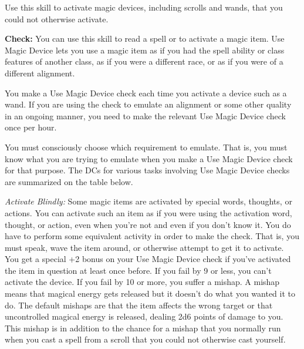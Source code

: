 Use this skill to activate magic devices, including scrolls and wands, that you could not otherwise activate.

\textbf{Check:} You can use this skill to read a spell or to activate a magic item. Use Magic Device lets you use a magic item as if you had the spell ability or class features of another class, as if you were a different race, or as if you were of a different alignment.

You make a Use Magic Device check each time you activate a device such as a wand. If you are using the check to emulate an alignment or some other quality in an ongoing manner, you need to make the relevant Use Magic Device check once per hour.

You must consciously choose which requirement to emulate. That is, you must know what you are trying to emulate when you make a Use Magic Device check for that purpose. The DCs for various tasks involving Use Magic Device checks are summarized on the table below.


\textit{Activate Blindly:} Some magic items are activated by special words, thoughts, or actions. You can activate such an item as if you were using the activation word, thought, or action, even when you're not and even if you don't know it. You do have to perform some equivalent activity in order to make the check. That is, you must speak, wave the item around, or otherwise attempt to get it to activate. You get a special +2 bonus on your Use Magic Device check if you've activated the item in question at least once before. If you fail by 9 or less, you can't activate the device. If you fail by 10 or more, you suffer a mishap. A mishap means that magical energy gets released but it doesn't do what you wanted it to do. The default mishaps are that the item affects the wrong target or that uncontrolled magical energy is released, dealing 2d6 points of damage to you. This mishap is in addition to the chance for a mishap that you normally run when you cast a spell from a scroll that you could not otherwise cast yourself.

